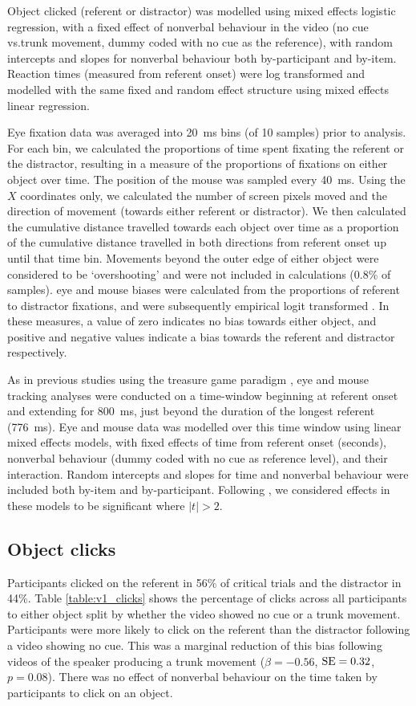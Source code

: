 \documentclass[a4paper,man,natbib]{apa6}
\newcommand{\resultsLog}[3]{$\beta = #1$, $\textnormal{SE} = #2$, $p #3$}
\begin{document}
Object clicked (referent or distractor) was modelled using mixed effects logistic regression, with a fixed effect of nonverbal behaviour in the video (no cue vs.\@ trunk movement, dummy coded with no cue as the reference), with random intercepts and slopes for nonverbal behaviour both by-participant and by-item.
Reaction times (measured from referent onset) were log transformed and modelled with the same fixed and random effect structure using mixed effects linear regression.

Eye fixation data was averaged into 20~ms bins (of 10 samples) prior to analysis.
For each bin, we calculated the proportions of time spent fixating the referent or the distractor, resulting in a measure of the proportions of fixations on either object over time.
The position of the mouse was sampled every 40~ms.
Using the $X$ coordinates only, we calculated the number of screen pixels moved and the direction of movement (towards either referent or distractor).
We then calculated the cumulative distance travelled towards each object over time as a proportion of the cumulative distance travelled in both directions from referent onset up until that time bin.
Movements beyond the outer edge of either object were considered to be `overshooting' and were not included in calculations (0.8\% of samples).
eye  and mouse  biases were calculated from the proportions of referent to distractor fixations, and were subsequently empirical logit transformed \citep{Barr2008}. 
In these measures, a value of zero indicates no bias towards either object, and positive and negative values indicate a bias towards the referent and distractor respectively.

As in previous studies using the treasure game paradigm \citep{King2018,Loy2017}, eye  and mouse  tracking analyses were conducted on a time-window beginning at referent onset and extending for 800~ms, just beyond the duration of the longest referent (776~ms).
Eye and mouse data was modelled over this time window using linear mixed effects models, with fixed effects of time from referent onset (seconds), nonverbal behaviour (dummy coded with no cue as reference level), and their interaction.
Random intercepts and slopes for time and nonverbal behaviour were included both by-item and by-participant.
Following \citet{Baayen2008}, we considered effects in these models to be significant where $|t|>2$.

\subsection{Object clicks}
Participants clicked on the referent in 56\% of critical trials and the distractor in 44\%.
Table \ref{table:v1_clicks} shows the percentage of clicks across all participants to either object split by whether the video showed no cue or a trunk movement.
Participants were more likely to click on the referent than the distractor following a video showing no cue. 
This was a marginal reduction of this bias following videos of the speaker producing a trunk movement (\resultsLog{-0.56}{0.32}{=0.08}).
There was no effect of nonverbal behaviour on the time taken by participants to click on an object.
\end{document}
